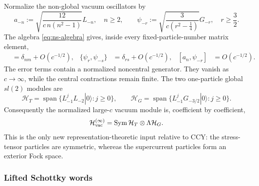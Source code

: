 \documentclass[11pt]{article}
\begin{document}
Normalize the non-global vacuum oscillators by
\begin{equation}
 a_{-n}:=\sqrt{\frac{12}{c\,n(n^2-1)}}L_{-n},
 \quad n\ge2,
 \qquad
 \psi_{-r}:=\sqrt{\frac{3}{c(r^2-\frac14)}}G_{-r},
 \quad r\ge\frac32.
 \label{eq:normalized-vacuum-oscillators}
\end{equation}
The algebra \eqref{eq:ns-algebra} gives, inside every fixed-particle-number
matrix element,
\begin{align}
 [a_n,a_{-m}]&=\delta_{nm}+O(c^{-1/2}),
 &
 \{\psi_r,\psi_{-s}\}&=\delta_{rs}+O(c^{-1/2}),
 &
 [a_n,\psi_{-r}]&=O(c^{-1/2}).
 \label{eq:free-vacuum-oscillators}
\end{align}
The error terms contain a normalized noncentral generator.  They vanish as
\(c\to\infty\), while the central contractions remain finite.  The two
one-particle global \(sl(2)\) modules are
\begin{equation}
 \mathcal H_T
 =\operatorname{span}\{L_{-1}^{j}L_{-2}|0\rangle:j\ge0\},
 \qquad
 \mathcal H_G
 =\operatorname{span}\{L_{-1}^{j}G_{-3/2}|0\rangle:j\ge0\}.
 \label{eq:vacuum-one-particle-modules}
\end{equation}
Consequently the normalized large-\(c\) vacuum module is, coefficient by
coefficient,
\begin{equation}
 \mathcal H_{\rm vac}^{(\infty)}
 =\operatorname{Sym}\mathcal H_T\otimes\Lambda\mathcal H_G.
 \label{eq:vacuum-fock-factorization}
\end{equation}
This is the only new representation-theoretic input relative to CCY: the
stress-tensor particles are symmetric, whereas the supercurrent particles
form an exterior Fock space.

\subsubsection{Lifted Schottky words}
\end{document}
